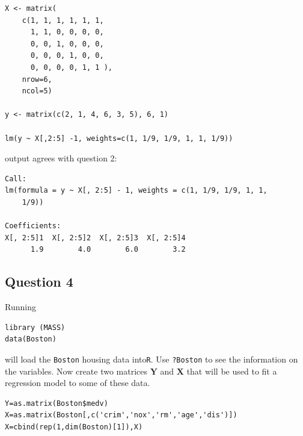 \documentclass[paper=a4, fontsize=11pt]{scrartcl} %
\newcommand{\matX}{\mathbf{X}}
\newcommand{\matY}{\mathbf{Y}}
\begin{document}
\begin{lstlisting}[basicstyle=\ttfamily\small\bfseries]
X <- matrix( 
    c(1, 1, 1, 1, 1, 1, 
      1, 1, 0, 0, 0, 0,
      0, 0, 1, 0, 0, 0,
      0, 0, 0, 1, 0, 0, 
      0, 0, 0, 0, 1, 1 ), 
    nrow=6, 
    ncol=5) 

y <- matrix(c(2, 1, 4, 6, 3, 5), 6, 1)

lm(y ~ X[,2:5] -1, weights=c(1, 1/9, 1/9, 1, 1, 1/9))
\end{lstlisting}
output agrees with question 2:
\begin{lstlisting}[basicstyle=\ttfamily\small\bfseries]
Call:
lm(formula = y ~ X[, 2:5] - 1, weights = c(1, 1/9, 1/9, 1, 1, 
    1/9))

Coefficients:
X[, 2:5]1  X[, 2:5]2  X[, 2:5]3  X[, 2:5]4  
      1.9        4.0        6.0        3.2  
\end{lstlisting}


\pagebreak

\subsection*{Question 4}
Running
\begin{lstlisting}[basicstyle=\ttfamily\small\bfseries]
library (MASS)
data(Boston)
\end{lstlisting}
will load the \texttt{Boston} housing data into\texttt{R}. Use \texttt{?Boston} to see the information on the variables.  Now create two matrices $\matY$ and $\matX$ that will be used to fit a regression model to some of these data.\\



\begin{lstlisting}[basicstyle=\ttfamily\small\bfseries]
Y=as.matrix(Boston$medv)
X=as.matrix(Boston[,c('crim','nox','rm','age','dis')])
X=cbind(rep(1,dim(Boston)[1]),X)
\end{lstlisting}
\end{document}
